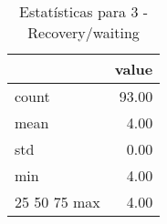 \begin{table}[htbp]
\caption{Estatísticas para 3 - Recovery/waiting}
\label{tab:3_-_recovery_waiting_summary}
\begin{tabular}{lr}
\toprule
 & value \\
\midrule
count & 93.00 \\
mean & 4.00 \\
std & 0.00 \\
min & 4.00 \\
25%
50%
75%
max & 4.00 \\
\bottomrule
\end{tabular}
\end{table}
